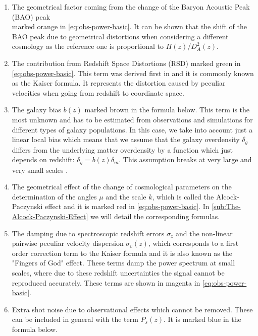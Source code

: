 \begin{enumerate}
\item The geometrical factor coming from the change of the Baryon Acoustic Peak (BAO) peak \\ marked orange
in \cref{eq:obs-power-basic}. It can be shown \cite{cite some BAO review} that the 
shift of the BAO peak due to geometrical distortions when considering a different cosmology
as the reference one is proportional to $H(z)$/$D^2_{A}(z)$.
\item The contribution from Redshift Space Distortions (RSD)
marked green in \cref{eq:obs-power-basic}. This term was derived first in
\citep{kaiser_clustering_1987} and it is commonly known as the Kaiser formula.
It represents the distortion caused by peculiar velocities when going from redshift to 
coordinate space.
\item The galaxy bias $b(z)$ marked brown in the formula below.
This term is the most unknown and has to be estimated from observations and simulations
for different types of galaxy populations. In this case, we take into account
just a linear local bias which means that we assume that the galaxy overdensity $\delta_g$ differs from the 
underlying matter overdensity by a function which just depends on redshift: $\delta_g = b(z) \delta_m$.
This assumption breaks at very large and very small scales \cite{cite some bias review}. 
\item The geometrical effect of the change of cosmological parameters
on the determination of the angles $\mu$ and the scale $k$, which is called the
Alcock-Paczynski effect \citep{alcock1979anevolution, ballinger_measuring_1996, feldman_power_1994} and it is marked red in \cref{eq:obs-power-basic}.
In \cref{sub:The-Alcock-Paczynski-Effect} we will detail the corresponding formulas.
\item The damping due to spectroscopic redshift errors $\sigma_{z}$ and the non-linear pairwise peculiar
velocity dispersion $\sigma_{v}(z)$, which corresponds to a first order correction
term to the Kaiser formula and it is also known as the "Fingers of God" effect. These terms damp the power spectrum at small scales, where due to these redshift
uncertainties the signal cannot be reproduced accurately. These terms are shown in magenta in \cref{eq:obs-power-basic}. 
\item Extra shot noise due to observational effects which cannot be removed. These can be included
in general with the term $P_{s}(z)$. It is marked blue in the formula below.
\end{enumerate}
